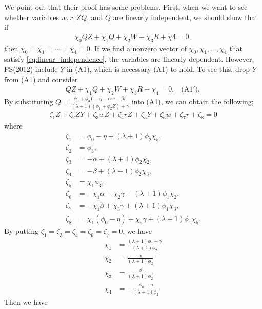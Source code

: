 \documentclass[11pt, a4paper]{article}
\begin{document}
We point out that their proof has some problems.
First, when we want to see whether variables $w, r, ZQ$, and $Q$ are linearly independent, we should show that if
\begin{align}
    \chi_0 QZ + \chi_1 Q + \chi_2 W + \chi_3 R + \chi4  = 0,
\end{align}
then $\chi_0  = \chi_1= \cdots = \chi_4 = 0$.
If we find a nonzero vector of $\chi_0,\chi_1, \ldots, \chi_4$ that satisfy \eqref{eq:linear_independence}, the variables are linearly dependent.
However, PS(2012) include $Y$ in (A1), which is necessary (A1) to hold. 
To see this, drop $Y$ from (A1) and consider 
\begin{align*}
    QZ + \chi_1 Q + \chi_2 W + \chi_3 R + \chi_4 = 0.\quad \text{(A1$'$)},
\end{align*}
By substituting $Q = \frac{\phi_0 + \phi_3Y -\eta - \alpha w -  \beta r}{(\lambda + 1) (\phi_1 + \phi_2 Z) + \gamma}$ into (A1), we can obtain the following;
\begin{align*}
    \zeta_1 Z + \zeta_2 ZY + \zeta_3 wZ + \zeta_4 rZ + \zeta_5 Y + \zeta_6 w + \zeta_7 r + \zeta_8 = 0 
\end{align*}
where
\begin{align*}
    \zeta_1 &= \phi_0-\eta+(\lambda + 1)\phi_2 \chi_5,\\
    \zeta_2 &= \phi_3,\\
    \zeta_3 &= -\alpha+(\lambda + 1)\phi_2 \chi_2,\\
    \zeta_4 &= -\beta+(\lambda + 1)\phi_2  \chi_3,\\
    \zeta_5 &= \chi_1 \phi_3,\\
    \zeta_6 &= -\chi_1\alpha+\chi_2\gamma+(\lambda+1)\phi_1 \chi_2,\\
    \zeta_7 &= -\chi_1\beta+\chi_3 \gamma+(\lambda+1)\phi_1 \chi_3,\\
    \zeta_8 &= \chi_1 (\phi_0 -\eta)+\chi_5\gamma+(\lambda+1)\phi_1 \chi_5.
\end{align*}
By putting $\zeta_1 = \zeta_3 = \zeta_4 = \zeta_6 = \zeta_7 =0$, we have
\begin{align*}
        \chi_1 &= \frac{(\lambda + 1)\phi_1 + \gamma}{(\lambda + 1)\phi_2}\\
        \chi_2 &= \frac{\alpha}{(\lambda + 1)\phi_2}\\
        \chi_3 &= \frac{\beta}{(\lambda + 1)\phi_2}\\
        \chi_4 &= -\frac{\phi_0 - \eta}{(\lambda + 1)\phi_2}
\end{align*}
Then we have
\end{document}
